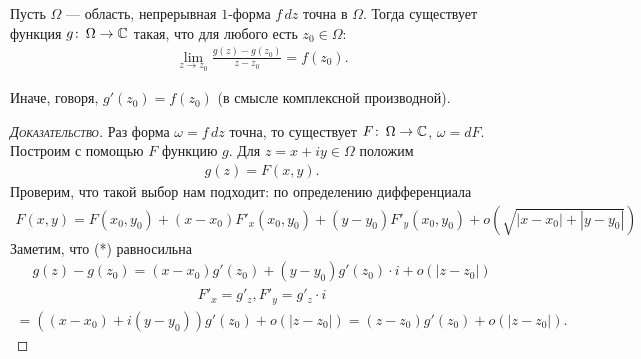 \begin{lm}
 Пусть $\Omega$ --- область, непрерывная $1$-форма $f\,dz$ точна в $\Omega$. Тогда существует функция $g \colon\,\Omega\to\mathbb{C}$ такая, что для любого есть $z_0 \in \Omega$:
 \begin{align*}
  \lim_{z \to z_0} \frac{g(z)-g(z_0)}{z-z_0} = f(z_0)
 .\end{align*} 

 Иначе, говоря, $g'(z_0) = f(z_0)$ (в смысле комплексной производной).
\end{lm}
\begin{proof}[\normalfont\textsc{Доказательство}]
 Раз форма $\omega = f\, dz$ точна, то существует $F \colon\, \Omega \to \mathbb{C} $, $\omega = dF$. Построим с помощью $F$ функцию $g$. Для $z = x+iy \in \Omega$ положим
 \begin{align*}
  g(z) = F(x,y).
 \end{align*} Проверим, что такой выбор нам подходит: по определению дифференциала
 \begin{align}
  F(x,y) = F(x_0, y_0) + (x-x_0) F'_x(x_0, y_0) + (y-y_0)F'_y(x_0,y_0) + o(\sqrt{\left| x-x_0 \right| + \left| y-y_0 \right|})
 \end{align} Заметим, что (*) равносильна
 \begin{align*}
  g(z) - g(z_0) = (x-x_0)g'(z_0) + (y-y_0)g'(z_0) \cdot i + o(\left| z-z_0 \right|)
 \end{align*} 
 \begin{align*}
  F'_x = g'_z, F'_y = g'_z \cdot i
 \end{align*} 
 \begin{align*}
  = ((x-x_0) + i(y-y_0))g'(z_0) + o(\left| z-z_0 \right|) = (z-z_0)g'(z_0) + o(\left| z-z_0 \right|).
 \end{align*} 
\end{proof}
